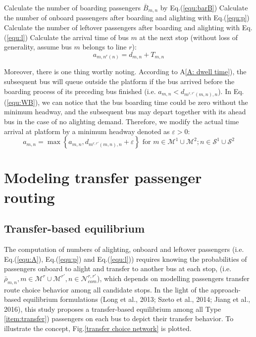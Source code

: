\documentclass[smallextended]{svjour3}       %
\begin{document}
\begin{Abstract}
\begin{algorithm}[H]
\begin{algorithmic}
                  \STATE Calculate the number of boarding passengers $\bar{B}_{m,n}$ by Eq.(\ref{equ:barB})
                  \STATE Calculate the number of onboard passengers after boarding and alighting with Eq.(\ref{equ:p})     
                  \STATE Calculate the number of leftover passengers after boarding and alighting with Eq.(\ref{equ:l})   
                      \STATE Calculate the arrival time of bus $m$ at the next stop (without loss of generality, assume bus $m$ belongs to line $r$):
                      \begin{equation}
                          \label{equ:a}
                          a_{m,n^{r}(n)}=d_{m,n}+T_{m,n}
                      \end{equation}
                  \ENDIF

              \ENDFOR
          \ENDFOR
      \ENDFOR
  \end{algorithmic}
\end{algorithm}
Moreover, there is one thing worthy noting. 
According to A\ref{A: dwell time}), the subsequent bus will queue outside the platform
if the bus arrived before the boarding process of its preceding bus finished (i.e. $a_{m,n}<d_{m^{r,r'}(m,n),n}$). 
In \textup{Eq.(\ref{equ:WB})}, we can notice that the bus boarding time could be zero
without the minimum headway, and the subsequent bus may depart together with its ahead bus in the case of no alighting demand.
Therefore, we modify the actual time arrival at platform by a minimum headway denoted as $\varepsilon>0$: 
\begin{equation}
        a_{m,n} = \max \left\{a_{m,n},d_{m^{r,r'}(m,n),n}+\varepsilon\right\} 
        \text{ for } m\in \mathcal{M}^{1}\cup\mathcal{M}^{2};
        n\in \mathcal{S}^{1}\cup\mathcal{S}^{2}
\end{equation}

\section{Modeling transfer passenger routing}\label{Transfer passenger routing}
\subsection{Transfer-based equilibrium}\label{equilibrium}
The computation of numbers of alighting, onboard and leftover passengers (i.e. Eq.(\ref{equ:A}), Eq.(\ref{equ:p}) and Eq.(\ref{equ:l})) requires knowing the probabilities of passengers onboard to alight and transfer to another bus at each stop, (i.e. $\bar{\rho}_{m,n}, m\in\mathcal{M}^{r}\cup\mathcal{M}^{r'},n\in\mathcal{N}_{com}^{r,r'}$), which depends on modelling passengers transfer route choice behavior among all candidate stops.  
In the light of the approach-based equilibrium formulations \textrm{(Long et al., 2013; Szeto et al., 2014; Jiang et al., 2016)}, this study proposes a transfer-based equilibrium among all Type \ref{item:transfer}) passengers on each bus to depict their transfer behavior.
To illustrate the concept, Fig.\ref{transfer choice network} is plotted.


\end{Abstract}
\end{document}
